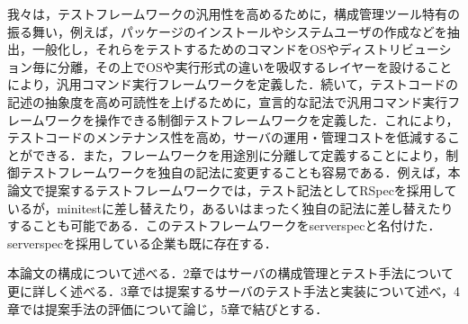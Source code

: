我々は，テストフレームワークの汎用性を高めるために，構成管理ツール特有の振る舞い，例えば，パッケージのインストールやシステムユーザの作成などを抽出，一般化し，それらをテストするためのコマンドをOSやディストリビューション毎に分離，その上でOSや実行形式の違いを吸収するレイヤーを設けることにより，汎用コマンド実行フレームワークを定義した．続いて，テストコードの記述の抽象度を高め可読性を上げるために，宣言的な記法で汎用コマンド実行フレームワークを操作できる制御テストフレームワークを定義した．これにより，テストコードのメンテナンス性を高め，サーバの運用・管理コストを低減することができる．また，フレームワークを用途別に分離して定義することにより，制御テストフレームワークを独自の記法に変更することも容易である．例えば，本論文で提案するテストフレームワークでは，テスト記法としてRSpec\cite{rspec}を採用しているが，minitest\cite{minitest}に差し替えたり，あるいはまったく独自の記法に差し替えたりすることも可能である．このテストフレームワークをserverspec\cite{serverspec}と名付けた．serverspecを採用している企業も既に存在する\cite{nintendo}\cite{wantedly}．

本論文の構成について述べる．2章ではサーバの構成管理とテスト手法について更に詳しく述べる．3章では提案するサーバのテスト手法と実装について述べ，4章では提案手法の評価について論じ，5章で結びとする．
